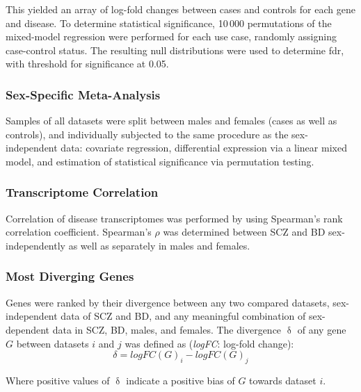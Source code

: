 \begin{method}
This yielded an array of log-fold changes between cases and controls for each gene and disease. To determine statistical significance, 10\,000 permutations of the mixed-model regression were performed for each use case, randomly assigning case-control status. The resulting null distributions were used to determine \ac{fdr}, with threshold for significance at 0.05. 

\subsubsection{Sex-Specific Meta-Analysis}
Samples of all datasets were split between males and females (cases as well as controls), and individually subjected to the same procedure as the sex-independent data: covariate regression, differential expression via a linear mixed model, and estimation of statistical significance via permutation testing.

\subsubsection{Transcriptome Correlation}
Correlation of disease transcriptomes was performed by using Spearman's rank correlation coefficient. Spearman's $\rho$ was determined between SCZ and BD sex-independently as well as separately in males and females.

\subsubsection{Most Diverging Genes}
Genes were ranked by their divergence between any two compared datasets, sex-independent data of SCZ and BD, and any meaningful combination of sex-dependent data in SCZ, BD, males, and females. The divergence $\updelta$ of any gene $G$ between datasets $i$ and $j$ was defined as (\emph{logFC}: log-fold change): $$\delta = logFC(G)_i - logFC(G)_j$$

Where positive values of $\updelta$ indicate a positive bias of $G$ towards dataset $i$.

\end{method}


